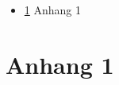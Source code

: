 
\begingroup
\let\clearpage\relax

\addchap{\appendixPhrase}

\begin{itemize}
	\item \ref{apx:doku} Anhang 1
\end{itemize}

\endgroup

\chapter{Anhang 1}
\label{apx:doku}
%
